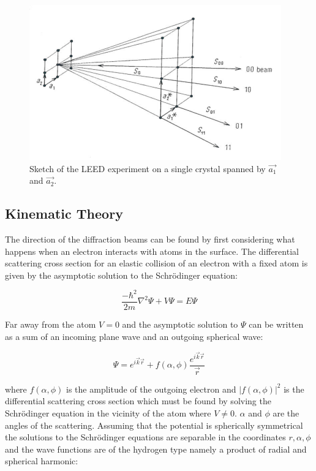 \begin{figure}[h!]
	\begin{center}
	\includegraphics[scale=4]{figures/09_07.png}
	\caption{Sketch of the LEED experiment on a single crystal spanned by $\vec{a_1}$ and $\vec{a_2}$.}
	\label{fig:leedsketch}
	\end{center}
\end{figure}

\subsection{Kinematic Theory}
The direction of the diffraction beams can be found by first considering what happens when an electron interacts with  atoms in the surface. The differential scattering cross section for an elastic collision of an electron with a fixed atom is given by the asymptotic solution to the Schr\"{o}dinger equation:

\begin{equation}
\frac{-\hbar^2}{2m}\nabla^2\Psi +V\Psi =E\Psi
\end{equation}

Far away from the atom $V=0$ and the asymptotic solution to $\Psi$ can be written as a sum of an incoming plane wave and an outgoing spherical wave:

\begin{equation}
\Psi =e^{i\vec{k}\vec{r}}+f(\alpha,\phi)\frac{e^{i\vec{k}\vec{r}}}{\vec{r}}
\end{equation}

\noindent where $f(\alpha,\phi)$ is the amplitude of the outgoing electron and $\vert f(\alpha,\phi)\vert^2$ is the differential scattering cross section which must be found by solving the Schr\"{o}dinger equation in the vicinity of the atom where $V\neq 0$. $\alpha$ and $\phi$ are the angles of the scattering. Assuming that the potential is spherically symmetrical the solutions to the Schr\"{o}dinger equations are separable in the coordinates $r, \alpha, \phi$ and the wave functions are of the hydrogen type namely a product of radial and spherical harmonic:


